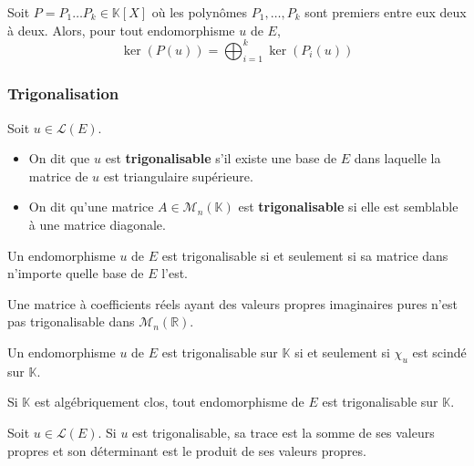 
  \begin{theorem}
    Soit $P = P_1 \dots P_k \in \mathbb{K}[X]$ où les polynômes $P_1, \dots, P_k$ sont premiers entre eux deux à deux. Alors, pour tout endomorphisme $u$ de $E$,
    \[ \ker(P(u)) = \bigoplus_{i=1}^k \ker(P_i(u)) \]
  \end{theorem}

  \subsubsection{Trigonalisation}


  \begin{definition}
    Soit $u \in \mathcal{L}(E)$.
    \begin{itemize}
      \item On dit que $u$ est \textbf{trigonalisable} s'il existe une base de $E$ dans laquelle la matrice de $u$ est triangulaire supérieure.
      \item On dit qu'une matrice $A \in \mathcal{M}_n(\mathbb{K})$ est \textbf{trigonalisable} si elle est semblable à une matrice diagonale.
    \end{itemize}
  \end{definition}

  \begin{remark}
    Un endomorphisme $u$ de $E$ est trigonalisable si et seulement si sa matrice dans n'importe quelle base de $E$ l'est.
  \end{remark}

  \begin{example}
    Une matrice à coefficients réels ayant des valeurs propres imaginaires pures n'est pas trigonalisable dans $\mathcal{M}_n(\mathbb{R})$.
  \end{example}

  \begin{theorem}
    Un endomorphisme $u$ de $E$ est trigonalisable sur $\mathbb{K}$ si et seulement si $\chi_u$ est scindé sur $\mathbb{K}$.
  \end{theorem}

  \begin{corollary}
    Si $\mathbb{K}$ est algébriquement clos, tout endomorphisme de $E$ est trigonalisable sur $\mathbb{K}$.
  \end{corollary}

  \begin{proposition}
    Soit $u \in \mathcal{L}(E)$. Si $u$ est trigonalisable, sa trace est la somme de ses valeurs propres et son déterminant est le produit de ses valeurs propres.
  \end{proposition}

